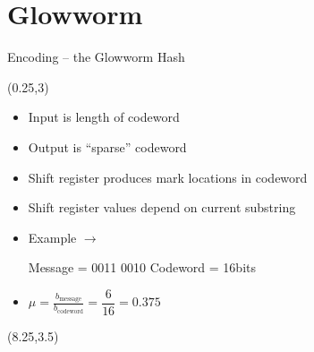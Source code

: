 \documentclass[xcolor=x11names,compress,handout]{beamer}
\begin{document}

\section{Glowworm}
\begin{frame}{Encoding -- the Glowworm Hash}
	\hspace{-1.25cm}
	
	\begin{textblock}{7.5}(0.25,3) %
		\begin{itemize}[<alert@+>]
		\setlength\itemsep{12pt}
			\item Input is length of codeword
			\item Output is ``sparse'' codeword
			\item Shift register produces mark locations in codeword
			\item Shift register values depend on current substring
			\item Example $\longrightarrow$ 
			
				Message = 0011 0010 
				Codeword = 16bits
			\item<14->\alert{ $\mu =\frac{b_{\text{message}}}{b_{\text{codeword}}} = \dfrac{6}{16} = 0.375 $}
		\end{itemize}
		
	\end{textblock}
	
	\begin{textblock}{7}(8.25,3.5) %
\end{textblock}
\end{frame}
\end{document}
